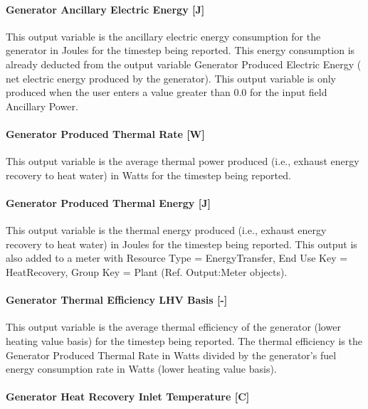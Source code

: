 \paragraph{Generator Ancillary Electric Energy {[}J{]}}\label{generator-ancillary-electric-energy-j}

This output variable is the ancillary electric energy consumption for the generator in Joules for the timestep being reported. This energy consumption is already deducted from the output variable Generator Produced Electric Energy ( net electric energy produced by the generator). This output variable is only produced when the user enters a value greater than 0.0 for the input field Ancillary Power.

\paragraph{Generator Produced Thermal Rate {[}W{]}}\label{generator-produced-thermal-rate-w-1}

This output variable is the average thermal power produced (i.e., exhaust energy recovery to heat water) in Watts for the timestep being reported.

\paragraph{Generator Produced Thermal Energy {[}J{]}}\label{generator-produced-thermal-energy-j-1}

This output variable is the thermal energy produced (i.e., exhaust energy recovery to heat water) in Joules for the timestep being reported. This output is also added to a meter with Resource Type = EnergyTransfer, End Use Key = HeatRecovery, Group Key = Plant (Ref. Output:Meter objects).

\paragraph{Generator Thermal Efficiency LHV Basis {[}-{]}}\label{generator-thermal-efficiency-lhv-basis--}

This output variable is the average thermal efficiency of the generator (lower heating value basis) for the timestep being reported. The thermal efficiency is the Generator Produced Thermal Rate in Watts divided by the generator's fuel energy consumption rate in Watts (lower heating value basis).

\paragraph{Generator Heat Recovery Inlet Temperature {[}C{]}}\label{generator-heat-recovery-inlet-temperature-c-1}


